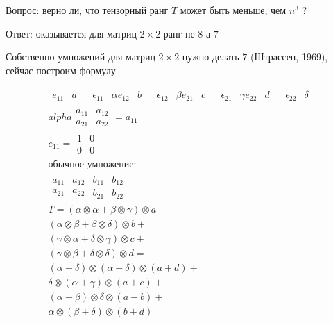 Вопрос: верно ли, что тензорный ранг $T$ может быть меньше, чем $n^3$ ?

Ответ: оказывается для матриц $2\times2$ ранг не $8$ а $7$

Собственно умножений для матриц $2\times2$ нужно делать $7$ (Штрассен, 1969), сейчас построим формулу

\begin{gather*}
    \begin{matrix}
        e_{11} & a & & \epsilon_{11} & \alpha
        e_{12} & b & & \epsilon_{12} & \beta
        e_{21} & c & & \epsilon_{21} & \gamma
        e_{22} & d & & \epsilon_{22} & \delta
    \end{matrix}\\
    alpha \begin{matrix}
        a_{11} & a_{12} \\
        a_{21} & a_{22}
    \end{matrix} = a_{11} \\
    e_{11} = \begin{matrix}
    1 & 0 \\
    0 & 0
    \end{matrix}\\
    \text{обычное умножение:} \\
    \begin{matrix}
        a_{11} & a_{12} \\
        a_{21} & a_{22}
    \end{matrix}
    \begin{matrix}
        b_{11} & b_{12} \\
        b_{21} & b_{22}
    \end{matrix} \\
    T = (\alpha \otimes \alpha + \beta  \otimes \gamma) \otimes a + \\
        (\alpha \otimes \beta  + \beta  \otimes \delta) \otimes b + \\
        (\gamma \otimes \alpha + \delta \otimes \gamma) \otimes c + \\
        (\gamma \otimes \beta  + \delta \otimes \delta) \otimes d = \\
        (\alpha - \delta) \otimes (\alpha - \delta) \otimes (a + d) + \\
        \delta \otimes (\alpha + \gamma) \otimes (a + c) + \\
        (\alpha - \beta) \otimes \delta \otimes (a - b) + \\
        \alpha \otimes (\beta + \delta) \otimes (b + d)
\end{gather*}

